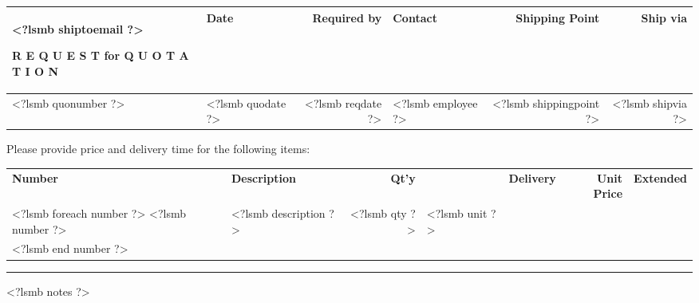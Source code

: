\documentclass{scrartcl}
\begin{document}
\begin{tabularx}{\textwidth}{@{}lXrlrr@{}}
{<?lsmb shiptoemail ?>
}
\hfill

\vspace{1cm}

\textbf{R E Q U E S T for Q U O T A T I O N}
\hfill

\vspace{1cm}

\begin{tabularx}{\textwidth}{*{6}{|X}|} \hline
  \textbf{RFQ \#} & \textbf{Date} & \textbf{Required by} & \textbf{Contact} & \textbf{Shipping Point} & \textbf{Ship via} \\ [0.5ex]
  \hline
  <?lsmb quonumber ?> & <?lsmb quodate ?> & <?lsmb reqdate ?> & <?lsmb employee ?> & <?lsmb shippingpoint ?> & <?lsmb shipvia ?> \\
  \hline
\end{tabularx}

\vspace{1cm}

Please provide price and delivery time for the following items:

\vspace{1cm}

\begin{tabularx}{\textwidth}{@{}lXrllrr@{}}
  \textbf{Number} & \textbf{Description} & \textbf{Qt'y} & &
  \textbf{Delivery} & \textbf{Unit Price} & \textbf{Extended} \\
<?lsmb foreach number ?>
  <?lsmb number ?> & <?lsmb description ?> & <?lsmb qty ?> & <?lsmb unit ?> \\
<?lsmb end number ?>
\end{tabularx}


\parbox{\textwidth}{
\rule{\textwidth}{2pt}

\hfill

<?lsmb notes ?>

}
\end{document}

